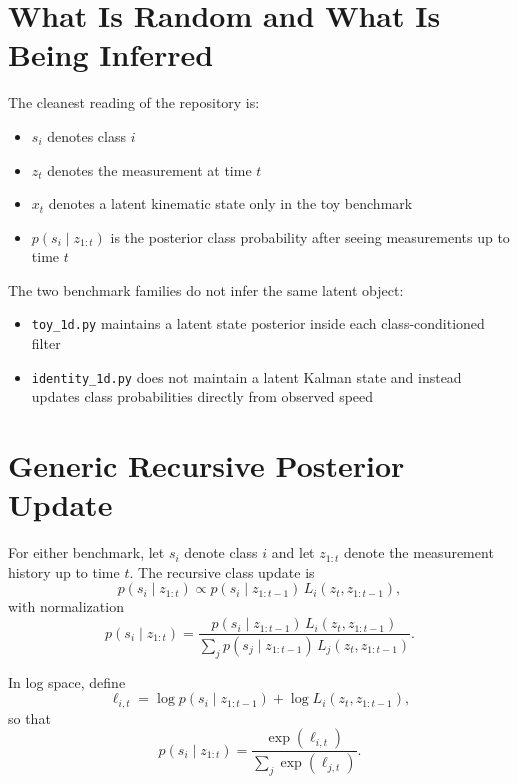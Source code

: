 \documentclass[11pt]{article}
\begin{document}
\section{What Is Random and What Is Being Inferred}

The cleanest reading of the repository is:
\begin{itemize}[leftmargin=1.5em]
    \item $s_i$ denotes class $i$
    \item $z_t$ denotes the measurement at time $t$
    \item $x_t$ denotes a latent kinematic state only in the toy benchmark
    \item $p(s_i \mid z_{1:t})$ is the posterior class probability after seeing
    measurements up to time $t$
\end{itemize}

The two benchmark families do not infer the same latent object:
\begin{itemize}[leftmargin=1.5em]
    \item \texttt{toy\_1d.py} maintains a latent state posterior inside each
    class-conditioned filter
    \item \texttt{identity\_1d.py} does not maintain a latent Kalman state and
    instead updates class probabilities directly from observed speed
\end{itemize}

\section{Generic Recursive Posterior Update}

For either benchmark, let $s_i$ denote class $i$ and let $z_{1:t}$ denote the
measurement history up to time $t$. The recursive class update is
\begin{equation}
    p(s_i \mid z_{1:t}) \propto p(s_i \mid z_{1:t-1}) \, L_i(z_t, z_{1:t-1}),
\end{equation}
with normalization
\begin{equation}
    p(s_i \mid z_{1:t}) =
    \frac{p(s_i \mid z_{1:t-1}) \, L_i(z_t, z_{1:t-1})}
    {\sum_j p(s_j \mid z_{1:t-1}) \, L_j(z_t, z_{1:t-1})}.
\end{equation}

In log space, define
\begin{equation}
    \ell_{i,t} = \log p(s_i \mid z_{1:t-1}) + \log L_i(z_t, z_{1:t-1}),
\end{equation}
so that
\begin{equation}
    p(s_i \mid z_{1:t}) =
    \frac{\exp(\ell_{i,t})}{\sum_j \exp(\ell_{j,t})}.
\end{equation}
\end{document}
